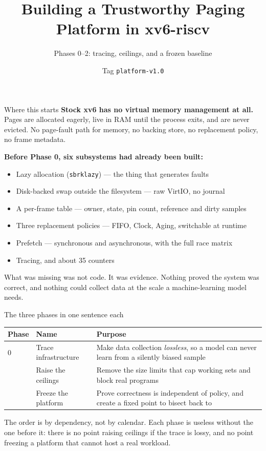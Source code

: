 \documentclass[10pt,aspectratio=169]{beamer}
\title{Building a Trustworthy Paging Platform in xv6-riscv}
\subtitle{Phases 0--2: tracing, ceilings, and a frozen baseline}
\date{Tag \texttt{platform-v1.0}}
\begin{document}
\maketitle


\begin{frame}{Where this starts}
  \small
  \textbf{Stock xv6 has no virtual memory management at all.} Pages are
  allocated eagerly, live in RAM until the process exits, and are never
  evicted. No page-fault path for memory, no backing store, no replacement
  policy, no frame metadata.

  \medskip
  \textbf{Before Phase 0, six subsystems had already been built:}
  \begin{itemize}
    \item Lazy allocation (\texttt{sbrklazy}) --- the thing that generates faults
    \item Disk-backed swap outside the filesystem --- raw VirtIO, no journal
    \item A per-frame table --- owner, state, pin count, reference and dirty samples
    \item Three replacement policies --- FIFO, Clock, Aging, switchable at runtime
    \item Prefetch --- synchronous and asynchronous, with the full race matrix
    \item Tracing, and about 35 counters
  \end{itemize}

  \medskip
  \alert{What was missing was not code. It was evidence.} Nothing proved the
  system was correct, and nothing could collect data at the scale a
  machine-learning model needs.
\end{frame}

\begin{frame}{The three phases in one sentence each}
  \small
  \begin{table}
    \begin{tabular}{@{}llp{7.4cm}@{}}
      \toprule
      \textbf{Phase} & \textbf{Name} & \textbf{Purpose} \\
      \midrule
      0 & Trace infrastructure & Make data collection \emph{lossless}, so a model
                                 can never learn from a silently biased sample \\
      \addlinespace
      1 & Raise the ceilings   & Remove the size limits that cap working sets
                                 and block real programs \\
      \addlinespace
      2 & Freeze the platform  & Prove correctness is independent of policy, and
                                 create a fixed point to bisect back to \\
      \bottomrule
    \end{tabular}
  \end{table}

  \medskip
  The order is by dependency, not by calendar. Each phase is useless without
  the one before it: there is no point raising ceilings if the trace is lossy,
  and no point freezing a platform that cannot host a real workload.
\end{frame}
\end{document}

